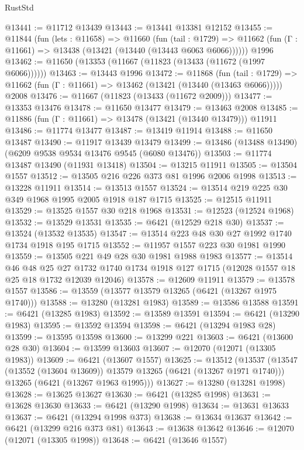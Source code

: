 \begin{lexlean}{RustStd}
\begin{coremodule}
@13441 := @11712 @13439
@13443 := @13441 @13381 @12152
@13455 := @11844
    (fun (lets : @11658) =>
    @11660
      (fun (tail : @1729) =>
      @11662 (fun (Γ : @11661) => @13438 (@13421 (@13440 (@13443 @6063 @6066))))))
    @1996
@13462 := @11650 (@13353 (@11667 (@11823 (@13433 (@11672 (@1997 @6066))))))
@13463 := @13443 @1996
@13472 := @11868
    (fun (tail : @1729) => @11662 (fun (Γ : @11661) => @13462 (@13421 (@13440 (@13463 @6066)))))
    @2008
@13476 := @11667 (@11823 (@13433 (@11672 @2009)))
@13477 := @13353 @13476
@13478 := @11650 @13477
@13479 := @13463 @2008
@13485 := @11886 (fun (Γ : @11661) => @13478 (@13421 (@13440 @13479))) @11911
@13486 := @11774 @13477
@13487 := @13419 @11914
@13488 := @11650 @13487
@13490 := @11917 @13439 @13479
@13499 := @13486 (@13488 @13490) (@6209 @9538 @9534 @13476 @9545 (@6080 @13476))
@13503 := @11774 @13487 @13490 (@11931 @13418)
@13504 := @13215 @11911
@13505 := @13504 @1557
@13512 := @13505 @216 @226 @373 @81 @1996 @2006 @1998
@13513 := @13228 @11911
@13514 := @13513 @1557
@13524 := @13514 @219 @225 @30 @349 @1968 @1995 @2005 @1918 @187 @1715
@13525 := @12515 @11911
@13529 := @13525 @1557 @30 @218 @1968
@13531 := @12523 (@12524 @1968)
@13532 := @13529 @13531
@13535 := @6421 (@12529 @218 @30)
@13537 := @13524 (@13532 @13535)
@13547 := @13514 @223 @48 @30 @27 @1992 @1740 @1734 @1918 @195 @1715
@13552 := @11957 @1557 @223 @30 @1981 @1990
@13559 := @13505 @221 @49 @28 @30 @1981 @1988 @1983
@13577 := @13514
    @46
    @48
    @25
    @27
    @1732
    @1740
    @1734
    @1918
    @127
    @1715
    (@12028 @1557 @18 @25 @18 @1732 @12039 @12046)
@13578 := @12609 @11911
@13579 := @13578 @1557
@13586 := @13559 (@13577 @13579 @13265 (@6421 (@13267 @1975 @1740)))
@13588 := @13280 (@13281 @1983)
@13589 := @13586 @13588
@13591 := @6421 (@13285 @1983)
@13592 := @13589 @13591
@13594 := @6421 (@13290 @1983)
@13595 := @13592 @13594
@13598 := @6421 (@13294 @1983 @28)
@13599 := @13595 @13598
@13600 := @13299 @221
@13603 := @6421 (@13600 @28 @30)
@13604 := @13599 @13603
@13607 := @12070 (@12071 (@13305 @1983))
@13609 := @6421 (@13607 @1557)
@13625 := @13512
    (@13537
      (@13547 (@13552 (@13604 @13609)) @13579 @13265 (@6421 (@13267 @1971 @1740)))
      @13265
      (@6421 (@13267 @1963 @1995)))
@13627 := @13280 (@13281 @1998)
@13628 := @13625 @13627
@13630 := @6421 (@13285 @1998)
@13631 := @13628 @13630
@13633 := @6421 (@13290 @1998)
@13634 := @13631 @13633
@13637 := @6421 (@13294 @1998 @373)
@13638 := @13634 @13637
@13642 := @6421 (@13299 @216 @373 @81)
@13643 := @13638 @13642
@13646 := @12070 (@12071 (@13305 @1998))
@13648 := @6421 (@13646 @1557)

\end{coremodule}
\end{lexlean}
